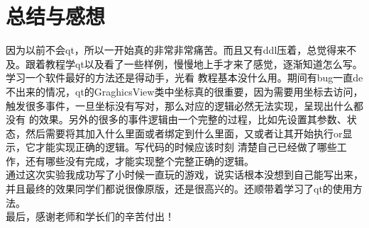 \documentclass[12pt,a4paper,UTF8]{article}
\begin{document}
\section{总结与感想}
因为以前不会qt，所以一开始真的非常非常痛苦。而且又有ddl压着，总觉得来不及。跟着教程学qt以及看了一些样例，慢慢地上手才来了感觉，逐渐知道怎么写。学习一个软件最好的方法还是得动手，光看
教程基本没什么用。期间有bug一直de不出来的情况，qt的GraghicsView类中坐标真的很重要，因为需要用坐标去访问，触发很多事件，一旦坐标没有写对，那么对应的逻辑必然无法实现，呈现出什么都没有
的效果。另外的很多的事件逻辑由一个完整的过程，比如先设置其参数、状态，然后需要将其加入什么里面或者绑定到什么里面，又或者让其开始执行or显示，它才能实现正确的逻辑。写代码的时候应该时刻
清楚自己已经做了哪些工作，还有哪些没有完成，才能实现整个完整正确的逻辑。\\
通过这次实验我成功写了小时候一直玩的游戏，说实话根本没想到自己能写出来，并且最终的效果同学们都说很像原版，还是很高兴的。还顺带着学习了qt的使用方法。\\
最后，感谢老师和学长们的辛苦付出！



%

      
  
\end{document}
